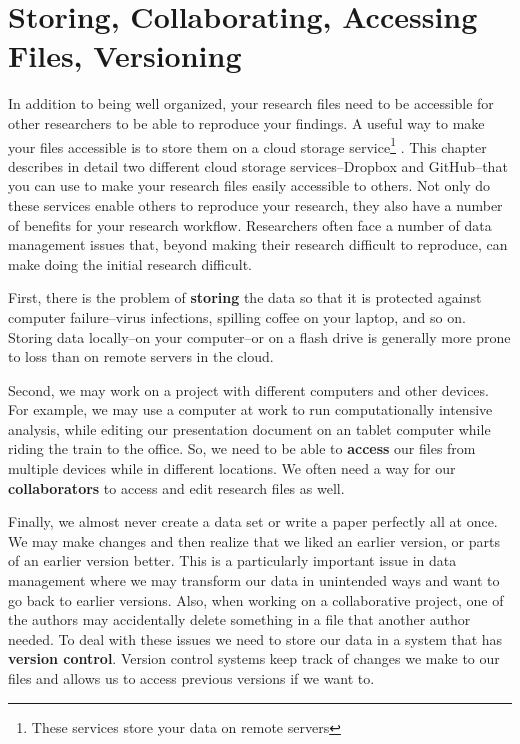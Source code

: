 



\chapter{Storing, Collaborating, Accessing Files, Versioning}\label{Storing}

In addition to being well organized, your research files need to be accessible for other researchers to be able to reproduce your findings. A useful way to make your files accessible is to store them on a cloud storage service\footnote{These services store your data on remote servers} \cite[see][]{Howe2012}. This chapter describes in detail two different cloud storage services--Dropbox and GitHub--that you can use to make your research files easily accessible to others. Not only do these services enable others to reproduce your research, they also have a number of benefits for your research workflow. Researchers often face a number of data management issues that, beyond making their research difficult to reproduce, can make doing the initial research difficult.

First, there is the problem of \textbf{storing} the data so that it is protected against computer failure--virus infections, spilling coffee on your laptop, and so on. Storing data locally--on your computer--or on a flash drive is generally more prone to loss than on remote servers in the cloud.

Second, we may work on a project with different computers and other devices. For example, we may use a computer at work to run computationally intensive analysis, while editing our presentation document on an tablet computer while riding the train to the office. So, we need to be able to \textbf{access} our files from multiple devices while in different locations. We often need a way for our \textbf{collaborators} to access and edit research files as well.

Finally, we almost never create a data set or write a paper perfectly all at once. We may make changes and then realize that we liked an earlier version, or parts of an earlier version better. This is a particularly important issue in data management where we may transform our data in unintended ways and want to go back to earlier versions. Also, when working on a collaborative project, one of the authors may accidentally delete something in a file that another author needed. To deal with these issues we need to store our data in a system that has \textbf{version control}. Version control systems keep track of changes we make to our files and allows us to access previous versions if we want to.

